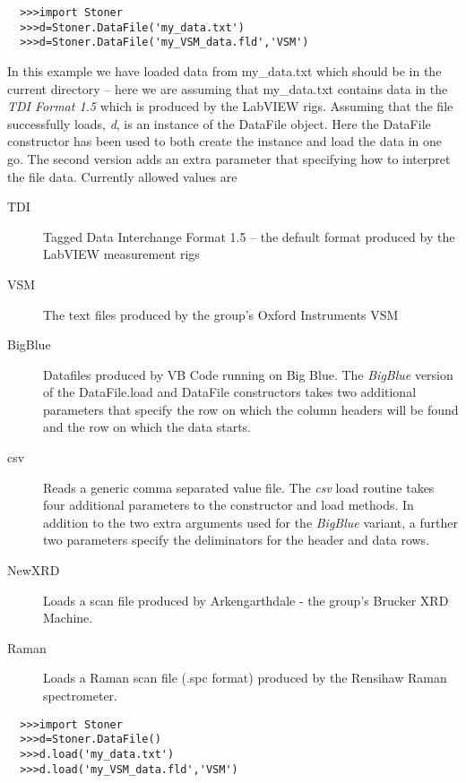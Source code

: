 \documentclass[a4paper,11pt]{scrartcl}
\begin{document}
\begin{verbatim}
  >>>import Stoner
  >>>d=Stoner.DataFile('my_data.txt')
  >>>d=Stoner.DataFile('my_VSM_data.fld','VSM')
\end{verbatim}

In this example we have loaded data from my\_data.txt which should be in the current directory -- here we are assuming that my\_data.txt contains data in the \textit{TDI Format 1.5} which is produced by the LabVIEW rigs. Assuming that the file successfully loads, \textit{d}, is an instance of the DataFile object. Here the DataFile constructor has been used to both create the instance and load the data in one go. The second version adds an extra parameter that specifying how to interpret the file data. Currently allowed values are

\begin{description}
\item[TDI] Tagged Data Interchange Format 1.5 -- the default format produced by the LabVIEW measurement rigs
\item[VSM] The text files produced by the group's Oxford Instruments VSM
\item[BigBlue] Datafiles produced by VB Code running on Big Blue. The \textit{BigBlue} version of the DataFile.load and DataFile constructors takes two additional parameters that specify the row on which the column headers will be found and the row on which the data starts.
\item[csv] Reads a generic comma separated value file. The \textit{csv} load routine takes four additional parameters to the constructor and load methods. In addition to the two extra arguments used for the \textit{BigBlue} variant, a further two parameters specify the deliminators for the header and data rows.
\item[NewXRD] Loads a scan file produced by Arkengarthdale - the group's Brucker XRD Machine.
\item[Raman] Loads a Raman scan file (.spc format) produced by the Rensihaw Raman spectrometer.
\end{description}

\begin{verbatim}
  >>>import Stoner
  >>>d=Stoner.DataFile()
  >>>d.load('my_data.txt')
  >>>d.load('my_VSM_data.fld','VSM')
\end{verbatim}

\end{document}
